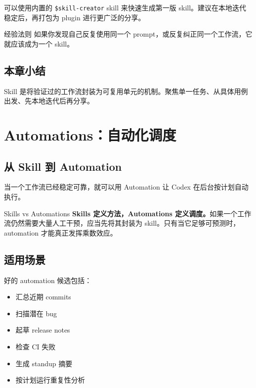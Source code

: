 \documentclass[a4paper]{article}
\begin{document}
可以使用内置的 \texttt{\$skill-creator} skill 来快速生成第一版 skill。建议在本地迭代稳定后，再打包为 plugin 进行更广泛的分享。

\begin{knowledgebox}{经验法则}
如果你发现自己反复使用同一个 prompt，或反复纠正同一个工作流，它就应该成为一个 skill。
\end{knowledgebox}

\subsection{本章小结}

Skill 是将验证过的工作流封装为可复用单元的机制。聚焦单一任务、从具体用例出发、先本地迭代后再分享。

\section{Automations：自动化调度}

\subsection{从 Skill 到 Automation}

当一个工作流已经稳定可靠，就可以用 Automation 让 Codex 在后台按计划自动执行。

\begin{importantbox}{Skills vs Automations}
\textbf{Skills 定义方法，Automations 定义调度。}如果一个工作流仍然需要大量人工干预，应当先将其封装为 skill。只有当它足够可预测时，automation 才能真正发挥乘数效应。
\end{importantbox}

\subsection{适用场景}

好的 automation 候选包括：

\begin{itemize}
    \item 汇总近期 commits
    \item 扫描潜在 bug
    \item 起草 release notes
    \item 检查 CI 失败
    \item 生成 standup 摘要
    \item 按计划运行重复性分析
\end{itemize}
\end{document}
